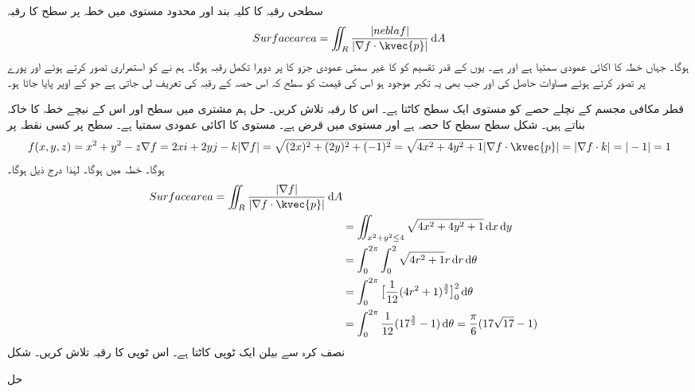 سطحی رقبہ کا کلیہ بند اور محدود مستوی میں خطہ  پر سطح 
کا رقبہ 
\begin{align}
Surface area = \iint_R \frac{|nebla f|}{|\nabla f \cdot \kvec{p}|} \dif A
\end{align}
ہوگا۔ جہاں  خطہ  کا اکائی عمودی سمتیا ہے اور 
ہے۔ یوں  کے قدر تقسیم  کو  کا غیر  سمتی عمودی جزو کا  پر دوہرا تکمل رقبہ ہوگا۔ ہم نے  کو استمراری تصور کرتے ہوئے اور پورے  پر  تصور کرتے ہوئے مساوات  حاصل کی اور جب بھی یہ تکبر موجود ہو اس کی قیمت کو سطح  کہ اس حصہ کے رقبہ کی تعریف لی جاتی ہے جو  کے اوپر پایا جاتا ہو۔ 

قطر مکافی مجسم 
کے نچلے حصے کو مستوی 
ایک سطح کاٹتا ہے۔ اس کا رقبہ تلاش کریں۔ 
حل 
ہم مشتری  میں  سطح  اور اس کے نیچے خطہ  کا خاکہ بناتے ہیں۔ شکل  سطح  سطح 
کا حصہ ہے اور  مستوی  میں قرض 
ہے۔ مستوی  کا اکائی عمودی سمتیا 
ہے۔ سطح پر کسی نقطہ  پر 
\begin{align}
f (x, y, z) = x^2 + y^2 - z
\nabla f = 2 x i + 2 y j - k
|\nabla f| = \sqrt{(2x)^2 + (2y)^2 + (-1)^2}
= \sqrt{4x^2 + 4y^2 + 1}
|\nabla f \cdot \kvec{p}| = |\nabla f \cdot k| = | -1 | = 1
\end{align}
ہوگا۔ خطہ  میں 
ہوگا۔ لہٰذا درج ذیل ہوگا۔ 
\begin{align}
Surface area = \iint_R \frac{|\nabla f|}{|\nabla f \cdot \kvec{p}|} \dif A \\
& = \iint_{x^2 + y^2 \le 4} \sqrt{4x^2 + 4y^2 + 1} \dif x \dif y \\
& = \int^{2 \pi}_0 \int^2_0 \sqrt{4r^2 + 1} r \dif r \dif \theta \\
& = \int^{2 \pi}_0 \big[ \frac{1}{12} (4 r^2 + 1)^{\frac{3}{2}} \big]^2_0 \dif \theta \\
& = \int^{2 \pi}_0 \frac{1}{12} (17^{\frac{3}{2}} -1) \dif \theta = \frac{\pi}{6} (17 \sqrt{17} - 1)
\end{align}
نصف کرہ 
سے بیلن 
ایک ٹوپی کاٹتا ہے۔ اس ٹوپی کا رقبہ تلاش کریں۔ شکل  

حل

